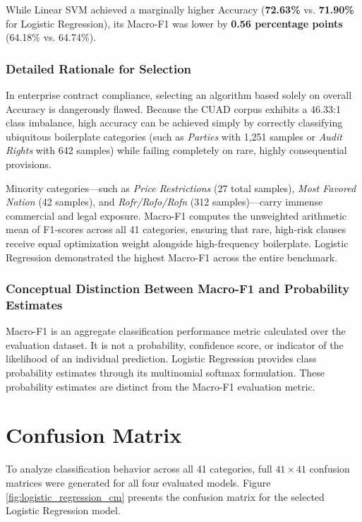 While Linear SVM achieved a marginally higher Accuracy (\textbf{72.63\%} vs. \textbf{71.90\%} for Logistic Regression), its Macro-F1 was lower by \textbf{0.56 percentage points} (64.18\% vs. 64.74\%).

\subsubsection*{Detailed Rationale for Selection}
In enterprise contract compliance, selecting an algorithm based solely on overall Accuracy is dangerously flawed. Because the CUAD corpus exhibits a 46.33:1 class imbalance, high accuracy can be achieved simply by correctly classifying ubiquitous boilerplate categories (such as \textit{Parties} with 1,251 samples or \textit{Audit Rights} with 642 samples) while failing completely on rare, highly consequential provisions. 

Minority categories—such as \textit{Price Restrictions} (27 total samples), \textit{Most Favored Nation} (42 samples), and \textit{Rofr/Rofo/Rofn} (312 samples)—carry immense commercial and legal exposure. Macro-F1 computes the unweighted arithmetic mean of F1-scores across all 41 categories, ensuring that rare, high-risk clauses receive equal optimization weight alongside high-frequency boilerplate. Logistic Regression demonstrated the highest Macro-F1 across the entire benchmark.

\subsubsection*{Conceptual Distinction Between Macro-F1 and Probability Estimates}
Macro-F1 is an aggregate classification performance metric calculated over the evaluation dataset. It is not a probability, confidence score, or indicator of the likelihood of an individual prediction. Logistic Regression provides class probability estimates through its multinomial softmax formulation. These probability estimates are distinct from the Macro-F1 evaluation metric.

\section{Confusion Matrix}
\label{sec:confusion_matrix}

To analyze classification behavior across all 41 categories, full $41 \times 41$ confusion matrices were generated for all four evaluated models. Figure \ref{fig:logistic_regression_cm} presents the confusion matrix for the selected Logistic Regression model.

